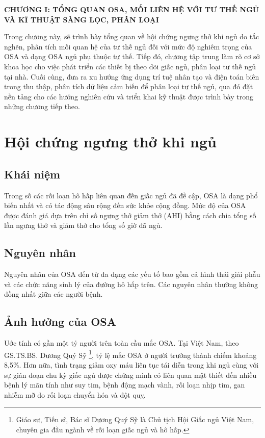 
\begin{center}
      \textbf{CHƯƠNG I: TỔNG QUAN OSA, MỐI LIÊN HỆ VỚI TƯ THẾ NGỦ VÀ
            KĨ THUẬT SÀNG LỌC, PHÂN LOẠI}
\end{center}
Trong chương này, sẽ trình bày tổng quan về hội chứng ngưng thở khi ngủ do tắc
nghẽn, phân tích mối quan hệ của tư thế ngủ đối với mức độ nghiêm trọng của OSA
và dạng OSA ngủ phụ thuộc tư thế. Tiếp đó, chương tập trung làm rõ cơ sở khoa
học cho việc phát triển các thiết bị theo dõi giấc ngủ, phân loại tư thế ngủ
tại nhà. Cuối cùng, đưa ra xu hướng ứng dụng trí tuệ nhân tạo và điện toán biên
trong thu thập, phân tích dữ liệu cảm biến để phân loại tư thế ngủ, qua đó đặt
nền tảng cho các hướng nghiên cứu và triển khai kỹ thuật được trình bày trong
những chương tiếp theo.
\section{Hội chứng ngưng thở khi ngủ}

\subsection{Khái niệm}

Trong số các rối loạn hô hấp liên quan đến giấc ngủ đã đề cập, OSA là dạng phổ
biến nhất và có tác động sâu rộng đến sức khỏe cộng đồng. Mức độ của OSA được
đánh giá dựa trên chỉ số ngưng thở giảm thở (AHI) bằng cách chia tổng số lần
ngưng thở và giảm thở cho tổng số giờ đã ngủ.

\subsection{Nguyên nhân}

Nguyên nhân của OSA đến từ đa dạng các yếu tố bao gồm cả hình thái giải phẫu và
các chức năng sinh lý của đường hô hấp trên. Các nguyên nhân thường không đồng
nhất giữa các người bệnh.

\subsection{Ảnh hưởng của OSA}
Uớc tính có gần một tỷ người trên toàn cầu mắc OSA. Tại Việt Nam, theo
GS.TS.BS. Dương Quý Sỹ \footnote{Giáo sư, Tiến sĩ, Bác sĩ Dương Quý Sỹ là Chủ
      tịch Hội Giấc ngủ Việt Nam, chuyên gia đầu ngành về rối loạn giấc ngủ và hô
      hấp.}, tỷ lệ mắc OSA ở người trưởng thành chiếm khoảng 8,5\%. Hơn nữa, tình
trạng giảm oxy máu liên tục tái diễn trong khi ngủ cùng với sự gián đoạn chu kỳ
giấc ngủ được chứng minh có liên quan mật thiết đến nhiều bệnh lý mãn tính như
suy tim, bệnh động mạch vành, rối loạn nhịp tim, gan nhiễm mỡ do rối loạn
chuyển hóa và đột quỵ.

